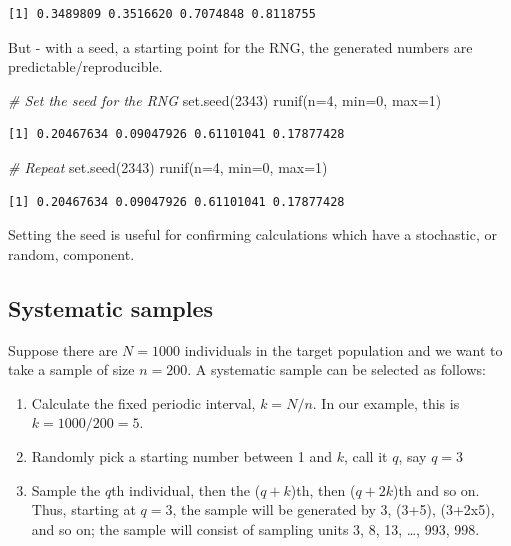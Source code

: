 \documentclass[
  oneside]{krantz}
\newenvironment{Shaded}{\begin{snugshade}}{\end{snugshade}}
\newcommand{\AttributeTok}[1]{\textcolor[rgb]{0.77,0.63,0.00}{#1}}
\newcommand{\CommentTok}[1]{\textcolor[rgb]{0.56,0.35,0.01}{\textit{#1}}}
\newcommand{\DecValTok}[1]{\textcolor[rgb]{0.00,0.00,0.81}{#1}}
\newcommand{\FunctionTok}[1]{\textcolor[rgb]{0.00,0.00,0.00}{#1}}
\newcommand{\NormalTok}[1]{#1}
\begin{document}
\begin{verbatim}
[1] 0.3489809 0.3516620 0.7074848 0.8118755
\end{verbatim}

But - with a seed, a starting point for the RNG, the generated numbers are predictable/reproducible.

\begin{Shaded}
\begin{Highlighting}[]
\CommentTok{\# Set the seed for the RNG}
\FunctionTok{set.seed}\NormalTok{(}\DecValTok{2343}\NormalTok{)}
\FunctionTok{runif}\NormalTok{(}\AttributeTok{n=}\DecValTok{4}\NormalTok{, }\AttributeTok{min=}\DecValTok{0}\NormalTok{, }\AttributeTok{max=}\DecValTok{1}\NormalTok{)}
\end{Highlighting}
\end{Shaded}

\begin{verbatim}
[1] 0.20467634 0.09047926 0.61101041 0.17877428
\end{verbatim}

\begin{Shaded}
\begin{Highlighting}[]
\CommentTok{\# Repeat}
\FunctionTok{set.seed}\NormalTok{(}\DecValTok{2343}\NormalTok{)}
\FunctionTok{runif}\NormalTok{(}\AttributeTok{n=}\DecValTok{4}\NormalTok{, }\AttributeTok{min=}\DecValTok{0}\NormalTok{, }\AttributeTok{max=}\DecValTok{1}\NormalTok{)}
\end{Highlighting}
\end{Shaded}

\begin{verbatim}
[1] 0.20467634 0.09047926 0.61101041 0.17877428
\end{verbatim}

Setting the seed is useful for confirming calculations which have a stochastic, or random, component.

\hypertarget{systematic-samples}{%
\subsection{Systematic samples}\label{systematic-samples}}

Suppose there are \(N=1000\) individuals in the target population and we want to take a sample of size \(n=200\). A systematic sample can be selected as follows:

\begin{enumerate}
\def\labelenumi{\arabic{enumi}.}
\item
  Calculate the fixed periodic interval, \(k = N/n\). In our example, this is \(k = 1000/200 = 5\).
\item
  Randomly pick a starting number between 1 and \(k\), call it \(q\), say \(q=3\)
\item
  Sample the \(q\)th individual, then the (\(q+k\))th, then (\(q+2k\))th and so on. Thus, starting at \(q=3\), the sample will be generated by 3, (3+5), (3+2x5), and so on; the sample will consist of sampling units 3, 8, 13, \ldots, 993, 998.
\end{enumerate}
\end{document}
